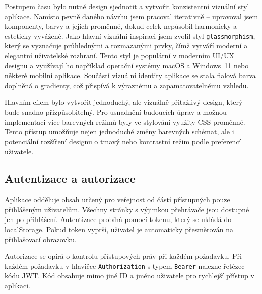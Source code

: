 Postupem času bylo nutné design sjednotit a vytvořit konzistentní vizuální styl aplikace.
Namísto pevně daného návrhu jsem pracoval iterativně -- upravoval jsem komponenty, barvy a jejich proměnné, dokud celek nepůsobil harmonicky a esteticky vyváženě. 
Jako hlavní vizuální inspiraci jsem zvolil styl \texttt{glassmorphism}, který se vyznačuje průhlednými a rozmazanými prvky, čímž vytváří moderní a elegantní uživatelské rozhraní.
Tento styl je populární v moderním UI/UX designu a využívají ho například operační systémy macOS a Windows~11 nebo některé mobilní aplikace.
Součástí vizuální identity aplikace se stala fialová barva doplněná o gradienty, což přispívá k výraznému a zapamatovatelnému vzhledu.

Hlavním cílem bylo vytvořit jednoduchý, ale vizuálně přitažlivý design, který bude snadno přizpůsobitelný. 
Pro usnadnění budoucích úprav a možnou implementaci více barevných režimů byly ve stylování využity CSS proměnné.
Tento přístup umožňuje nejen jednoduché změny barevných schémat, ale i potenciální rozšíření designu o tmavý nebo kontrastní režim podle preferencí uživatele.


\subsection{Autentizace a autorizace}

Aplikace odděluje obsah určený pro veřejnost od částí přístupných pouze přihlášeným uživatelům. 
Všechny stránky s výjimkou přehrávače jsou dostupné jen po přihlášení. 
Autentizace probíhá pomocí tokenu, který se ukládá do localStorage. 
Pokud token vyprší, uživatel je automaticky přesměrován na přihlašovací obrazovku.

Autorizace se opírá o kontrolu přístupových práv při každém požadavku. 
Při každém požadavku v hlavičce \texttt{Authorization} s typem \texttt{Bearer} nalezne řetězec kódu JWT.
Kód obsahuje mimo jiné ID a jméno uživatele pro rychlejší přístup v aplikaci.

